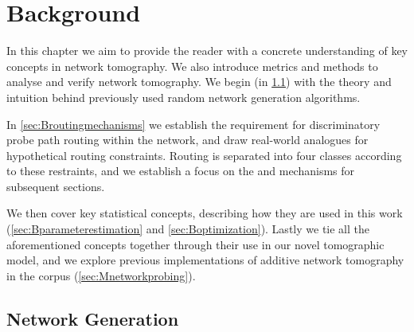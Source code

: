 \chapter{Background}
\label{cha:background}

In this chapter we aim to provide the reader with a concrete understanding of key concepts in network tomography. We also introduce metrics and methods to analyse and verify network tomography. We begin (in \cref{sec:Bgraphgeneration}) with the theory and intuition behind previously used random network generation algorithms.\par
In \cref{sec:Broutingmechanisms} we establish the requirement for discriminatory probe path routing within the network, and draw real-world analogues for hypothetical routing constraints. Routing is separated into four classes according to these restraints, and we establish a focus on the \cbr and \cfr mechanisms for subsequent sections.\par
We then cover key statistical concepts, describing how they are used in this work (\cref{sec:Bparameterestimation} and \cref{sec:Boptimization}). Lastly we tie all the aforementioned concepts together through their use in our novel tomographic model, and we explore previous implementations of additive network tomography in the corpus (\cref{sec:Mnetworkprobing}).

\section{Network Generation}
\label{sec:Bgraphgeneration}

